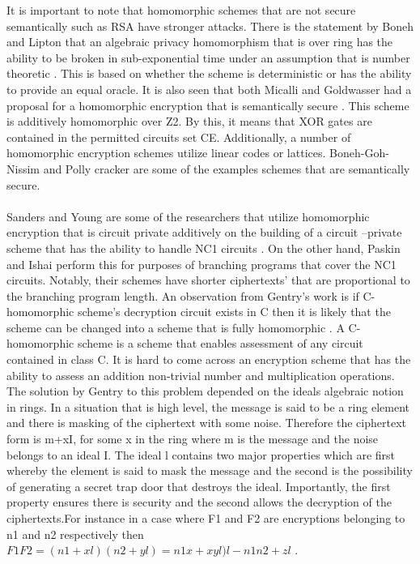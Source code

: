 It is important to note that homomorphic schemes that are not secure semantically such as RSA have stronger attacks. There is the statement by Boneh and Lipton that an algebraic privacy homomorphism that is over ring has the ability to be broken in sub-exponential time under an assumption that is number theoretic \cite{gen09b}. This is based on whether the scheme is deterministic or has the ability to provide an equal oracle. It is also seen that both Micalli and Goldwasser had a proposal for a homomorphic encryption that is semantically secure \cite{gen09b}. This scheme is additively homomorphic over Z2. By this, it means that XOR gates are contained in the permitted circuits set CE. Additionally, a number of homomorphic encryption schemes utilize linear codes or lattices. Boneh-Goh-Nissim and Polly cracker are some of the examples schemes that are semantically secure.\\\\
Sanders and Young are some of the researchers that utilize homomorphic encryption that is circuit private additively on the building of a circuit –private scheme that has the ability to handle NC1 circuits \cite{gen09b}. On the other hand, Paskin and Ishai perform this for purposes of branching programs that cover the NC1 circuits. Notably, their schemes have shorter ciphertexts’ that are proportional to the branching program length.
An observation from Gentry’s work is if C- homomorphic scheme’s decryption circuit exists in C then it is likely that the scheme can be changed into a scheme that is fully homomorphic \cite{brakerski2011fully}. A C-homomorphic scheme is a scheme that enables assessment of any circuit contained in class C. It is hard to come across an encryption scheme that has the ability to assess an addition non-trivial number and multiplication operations.
\newpage
The solution by Gentry to this problem depended on the ideals algebraic notion in rings. In a situation that is high level, the message is said to be a ring element and there is masking of the ciphertext with some noise. Therefore the ciphertext form is m+xI, for some x in the ring where m is the message and the noise belongs to an ideal I. The ideal l contains two major properties which are first whereby the element is said to mask the message and the second is the possibility of generating a secret trap door that destroys the ideal. Importantly, the first property ensures there is security and the second allows the decryption of the ciphertexts.For instance in a case where F1 and F2 are encryptions belonging to n1 and n2 respectively then $F1F2=(n1+ xl)(n2+yl)=n1x +xyl)l-n1n2+zl$ \cite{brakerski2011fully}. \\\\
